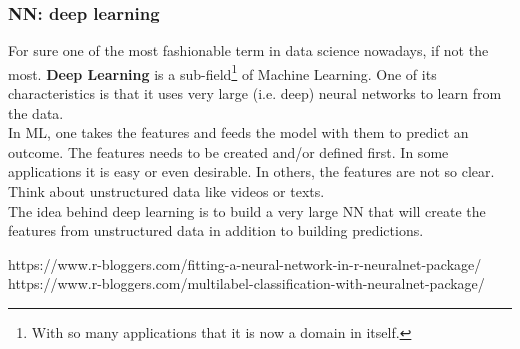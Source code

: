 \begin{frame}
\frametitle{NN: deep learning}
For sure one of the most fashionable term in data science nowadays, if not the most. {\bf Deep Learning} is a sub-field\footnote{With so many applications that it is now a domain in itself.} of Machine Learning. One of its characteristics is that it uses very large (i.e. deep) neural networks to learn from the data. \\
\vspace{0.2cm}
In ML, one takes the features and feeds the model with them to predict an outcome. The features needs to be created and/or defined first. In some applications it is easy or even desirable. In others, the features are not so clear. Think about unstructured data like videos or texts.\\
\vspace{0.2cm}
The idea behind deep learning is to build a very large NN that will create the features from unstructured data in addition to building predictions. 
\end{frame}
https://www.r-bloggers.com/fitting-a-neural-network-in-r-neuralnet-package/
https://www.r-bloggers.com/multilabel-classification-with-neuralnet-package/

